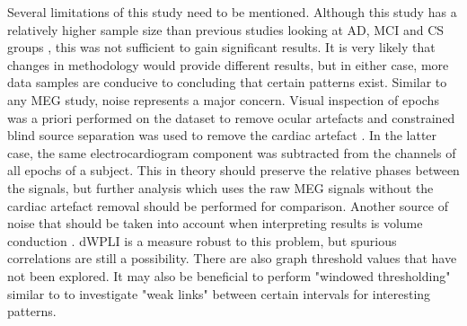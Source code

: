 Several limitations of this study need to be mentioned. Although this study has a relatively higher sample size than previous studies looking at \ac{AD}, \ac{MCI} and \ac{CS} groups \autocite{Tijms2013}, this was not sufficient to gain significant results. It is very likely that changes in methodology would provide different results, but in either case, more data samples are conducive to concluding that certain patterns exist. Similar to any \ac{MEG} study, noise represents a major concern. Visual inspection of epochs was a priori performed on the dataset to remove ocular artefacts and constrained blind source separation was used to remove the cardiac artefact \autocite{Escudero2011b}. In the latter case, the same electrocardiogram component was subtracted from the channels of all epochs of a subject. This in theory should preserve the relative phases between the signals, but further analysis which uses the raw \ac{MEG} signals without the cardiac artefact removal should be performed for comparison. Another source of noise that should be taken into account when interpreting results is volume conduction \autocite{Gross2013}. \ac{dWPLI} is a measure robust to this problem, but spurious correlations are still a possibility. There are also graph threshold values that have not been explored. It may also be beneficial to perform "windowed thresholding" similar to \textcite{Bassett2012Schizo} to investigate "weak links" between certain intervals for interesting patterns.